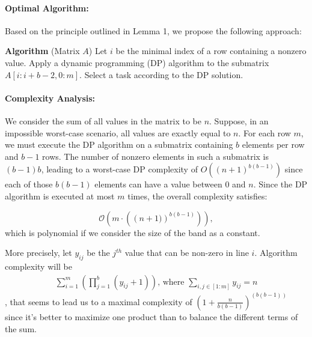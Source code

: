 \documentclass{article}
\begin{document}
\paragraph{Optimal Algorithm:} Based on the principle outlined in Lemma 1, we propose the following approach:

\begin{algorithmic}
\State \textbf{Algorithm} (Matrix $A$)
\State Let $i$ be the minimal index of a row containing a nonzero value.
\State Apply a dynamic programming (DP) algorithm to the submatrix $A[i : i + b - 2, 0:m]$.
\State Select a task according to the DP solution.
\EndWhile
\EndWhile
\end{algorithmic}

\paragraph{Complexity Analysis:}
We consider the sum of all values in the matrix to be $n$. Suppose, in an impossible  worst-case scenario, all values are exactly equal to $n$. For each row $m$, we must execute the DP algorithm on a submatrix containing $b$ elements per row and $b-1$ rows. The number of nonzero elements in such a submatrix is $(b-1)b$, leading to a worst-case DP complexity of $O((n+1)^{b(b-1)})$ since each of those $b(b-1)$ elements can have a value between $0$ and $n$. Since the DP algorithm is executed at most $m$ times, the overall complexity satisfies:

\begin{equation*}
\mathcal{O}\left(
	m \cdot \left( \left(n+1)\right)^{b(b-1)}\right)
	\right),
\end{equation*}
which is polynomial if we consider the size of the band as a constant.

More precisely, let $y_{ij}$ be the $j^{th}$ value that can be non-zero in line $i$. Algorithm complexity will be  
\begin{align*}
\sum_{i=1}^m \left(\prod_{j=1}^b (y_{ij}+1)\right)\text{, where }\sum_{i, j \in [1:m]}y_{ij}=n
\end{align*}, that seems to lead us to a maximal complexity of $\left(1+\frac{n}{b(b-1)}\right)^{\left(b(b-1)\right)}$ since it's better to maximize one product than to balance the different terms of the sum.
\end{document}
